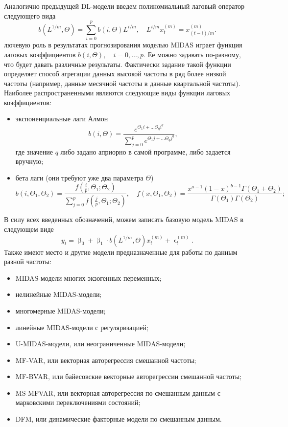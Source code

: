 \documentclass[a4paper, 12pt]{extarticle}
\renewcommand{\beta}{\upbeta}
\renewcommand{\epsilon}{\upvarepsilon}
\begin{document}
	Аналогично предыдущей DL-модели введем полиномиальный лаговый оператор следующего вида 
	\begin{equation}
		b(L^{1/m}, \Theta) = \sum_{i=0}^{p} b(i, \Theta) L^{i/m},\quad L^{i/m}x_t^{(m)} = x_{(t-i)/m}^{(m)}.
	\end{equation}
	лючевую роль в результатах прогнозирования моделью MIDAS играет функция лаговых коэффициентов $b(i, \Theta),\quad i=0,\ldots,p.$
	Ее можно задавать по-разному, что будет давать различные результаты. Фактически задание такой функции определяет способ агрегации данных высокой частоты в ряд более низкой частоты (например, данные месячной частоты в данные квартальной частоты).
	Наиболее распространенными являются следующие виды функции лаговых коэффициентов:
	\begin{itemize}
		\item экспоненциальные лаги Алмон
		\begin{equation}
			b(i, \Theta) = \dfrac{e^{\Theta_1 i + \ldots \Theta_q i^q}}{\sum\limits_{j=0}^{p}e^{\Theta_1 j + \ldots \Theta_q j^q}},
		\end{equation}
		где значение $q$ либо задано априорно в самой программе, либо задается вручную;
		\item бета лаги (они требуют уже два параметра $\Theta$)
		\begin{equation}
			b(i, \Theta_1, \Theta_2) = \dfrac{f(\frac i p, \Theta_1;\Theta_2)}{\sum\limits_{j=0}^{p}f(\frac j p, \Theta_1;\Theta_2)},\quad f(x, \Theta_1, \Theta_2) = \dfrac{x^{a-1}(1-x)^{b-1}\Gamma(\Theta_1 + \Theta_2)}{\Gamma(\Theta_1)\Gamma(\Theta_2)};
		\end{equation}
	\end{itemize}
	В силу всех введенных обозначений, можем записать базовую модель MIDAS в следующем виде
	\begin{equation}
		y_t = \beta_0 + \beta_1\cdot b(L^{1/m}, \Theta) x_t^{(m)} + \epsilon_t^{(m)}.
	\end{equation}
	Также имеют место и другие модели предназначенные для работы по данным разной частоты:
	\begin{itemize}
		\item MIDAS-модели многих экзогенных переменных;
		\item нелинейные MIDAS-модели;
		\item многомерные MIDAS-модели;
		\item линейные MIDAS-модели с регуляризацией;
		\item U-MIDAS-модели, или неограниченные MIDAS-модели;
		\item MF-VAR, или векторная авторегрессия смешанной частоты;
		\item MF-BVAR, или байесовские векторные авторегрессии смешанной частоты;
		\item MS-MFVAR, или векторная авторегрессия по смешанным данным с марковскими переключениями состояний;
		\item DFM, или динамические факторные модели по смешанным данным.
	\end{itemize}
\end{document}

